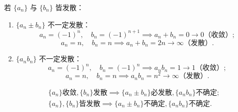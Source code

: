 \begin{solution}
    若 $\{a_n\}$ 与 $\{b_n\}$ 皆发散：
    \begin{enumerate}
        \item $\{a_n \pm b_n\}$ 不一定发散：
              \begin{equation}
                  a_n = (-1)^n, \quad b_n = (-1)^{n+1} \implies a_n + b_n = 0 \to 0 \text{（收敛）};
              \end{equation}
              \begin{equation}
                  a_n = n, \quad b_n = n \implies a_n + b_n = 2n \to \infty \text{（发散）}.
              \end{equation}
        \item $\{a_n b_n\}$ 不一定发散：
              \begin{equation}
                  a_n = (-1)^n, \quad b_n = (-1)^n \implies a_n b_n = 1 \to 1 \text{（收敛）};
              \end{equation}
              \begin{equation}
                  a_n = n, \quad b_n = n \implies a_n b_n = n^2 \to \infty \text{（发散）}.
              \end{equation}
    \end{enumerate}
    \begin{equation}
        \boxed{
            \begin{aligned}
                 & \{a_n\}\text{收敛}, \{b_n\}\text{发散} \implies \{a_n \pm b_n\}\text{必发散}, \{a_n b_n\}\text{不确定}; \\
                 & \{a_n\}, \{b_n\}\text{皆发散} \implies \{a_n \pm b_n\}\text{不确定}, \{a_n b_n\}\text{不确定}.
            \end{aligned}
        }
    \end{equation}
\end{solution}

